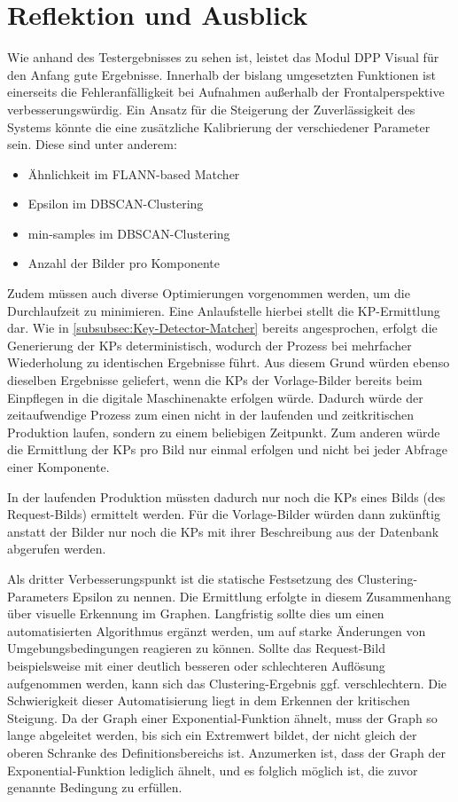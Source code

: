 \documentclass[
    type=Prakikumsbericht,
    status=draft, %
    language=german, %
    bibengine=bibtex,
]{unibwm-inf-thesis}
\begin{document}
    \section{Reflektion und Ausblick}
    Wie anhand des Testergebnisses zu sehen ist, leistet das Modul \ac{DPP} Visual für den Anfang gute Ergebnisse.
    Innerhalb der bislang umgesetzten Funktionen ist einerseits die Fehleranfälligkeit bei Aufnahmen außerhalb der Frontalperspektive verbesserungswürdig.
    Ein Ansatz für die Steigerung der Zuverlässigkeit des Systems könnte die eine zusätzliche Kalibrierung der verschiedener Parameter sein.
    Diese sind unter anderem:
    \begin{itemize}
        \item Ähnlichkeit im \ac{FLANN}-based Matcher
        \item Epsilon im \ac{DBSCAN}-Clustering
        \item min-samples im \ac{DBSCAN}-Clustering
        \item Anzahl der Bilder pro Komponente
    \end{itemize}

    Zudem müssen auch diverse Optimierungen vorgenommen werden, um die Durchlaufzeit zu minimieren.
    Eine Anlaufstelle hierbei stellt die \ac{KP}-Ermittlung dar.
    Wie in \autoref{subsubsec:Key-Detector-Matcher} bereits angesprochen, erfolgt die Generierung der \acp{KP} deterministisch, wodurch der Prozess bei mehrfacher Wiederholung zu identischen Ergebnisse führt.
    Aus diesem Grund würden ebenso dieselben Ergebnisse geliefert, wenn die \acp{KP} der Vorlage-Bilder bereits beim Einpflegen in die digitale Maschinenakte erfolgen würde.
    Dadurch würde der zeitaufwendige Prozess zum einen nicht in der laufenden und zeitkritischen Produktion laufen, sondern zu einem beliebigen Zeitpunkt.
    Zum anderen würde die Ermittlung der \acp{KP} pro Bild nur einmal erfolgen und nicht bei jeder Abfrage einer Komponente.

    In der laufenden Produktion müssten dadurch nur noch die \acp{KP} eines Bilds (des Request-Bilds) ermittelt werden.
    Für die Vorlage-Bilder würden dann zukünftig anstatt der Bilder nur noch die \acp{KP} mit ihrer Beschreibung aus der Datenbank abgerufen werden.

    Als dritter Verbesserungspunkt ist die statische Festsetzung des Clustering-Parameters Epsilon zu nennen.
    Die Ermittlung erfolgte in diesem Zusammenhang über visuelle Erkennung im Graphen.
    Langfristig sollte dies um einen automatisierten Algorithmus ergänzt werden, um auf starke Änderungen von Umgebungsbedingungen reagieren zu können.
    Sollte das Request-Bild beispielsweise mit einer deutlich besseren oder schlechteren Auflösung aufgenommen werden, kann sich das Clustering-Ergebnis ggf. verschlechtern.
    Die Schwierigkeit dieser Automatisierung liegt in dem Erkennen der kritischen Steigung.
    Da der Graph einer Exponential-Funktion ähnelt, muss der Graph so lange abgeleitet werden, bis sich ein Extremwert bildet, der nicht gleich der oberen Schranke des Definitionsbereichs ist.
    Anzumerken ist, dass der Graph der Exponential-Funktion lediglich ähnelt, und es folglich möglich ist, die zuvor genannte Bedingung zu erfüllen.
\end{document}
